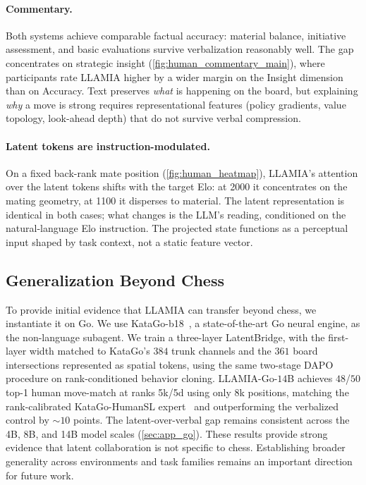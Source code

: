 \paragraph{Commentary.}
Both systems achieve comparable factual accuracy: material balance, initiative assessment, and basic evaluations survive verbalization reasonably well. The gap concentrates on strategic insight (\cref{fig:human_commentary_main}), where participants rate LLAMIA higher by a wider margin on the Insight dimension than on Accuracy. Text preserves \emph{what} is happening on the board, but explaining \emph{why} a move is strong requires representational features (policy gradients, value topology, look-ahead depth) that do not survive verbal compression.

\paragraph{Latent tokens are instruction-modulated.}
On a fixed back-rank mate position (\cref{fig:human_heatmap}), LLAMIA's attention over the latent tokens shifts with the target Elo: at 2000 it concentrates on the mating geometry, at 1100 it disperses to material. The latent representation is identical in both cases; what changes is the LLM's reading, conditioned on the natural-language Elo instruction. The projected state functions as a perceptual input shaped by task context, not a static feature vector.

\subsection{Generalization Beyond Chess}
\label{sec:results_go}

To provide initial evidence that LLAMIA can transfer beyond chess, we instantiate it on Go. We use KataGo-b18~\cite{wu2019katago}, a state-of-the-art Go neural engine, as the non-language subagent. We train a three-layer LatentBridge, with the first-layer width matched to KataGo's $384$ trunk channels and the $361$ board intersections represented as spatial tokens, using the same two-stage DAPO procedure on rank-conditioned behavior cloning. LLAMIA-Go-$14$B achieves $48$/$50$ top-1 human move-match at ranks 5k/5d using only $8$k positions, matching the rank-calibrated KataGo-HumanSL expert~\cite{wu2024katagohuman} and outperforming the verbalized control by ${\sim}10$ points. The latent-over-verbal gap remains consistent across the 4B, 8B, and 14B model scales (\cref{sec:app_go}). These results provide strong evidence that latent collaboration is not specific to chess. Establishing broader generality across environments and task families remains an important direction for future work.